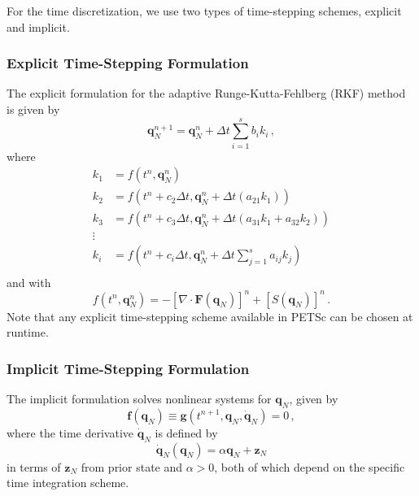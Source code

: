 For the time discretization, we use two types of time-stepping schemes, explicit and implicit.

\subsubsection{Explicit Time-Stepping Formulation}

The explicit formulation for the adaptive Runge-Kutta-Fehlberg (RKF) method is given by
\begin{equation}
       \mathbf{q}_N^{n+1} = \mathbf{q}_N^n + \Delta t \sum_{i=1}^{s} b_i k_i \, ,
\end{equation}
where
\begin{equation}
       \begin{aligned}
          k_1 &= f(t^n, \mathbf{q}_N^n)\\
          k_2 &= f(t^n + c_2 \Delta t, \mathbf{q}_N^n + \Delta t (a_{21} k_1))\\
          k_3 &= f(t^n + c_3 \Delta t, \mathbf{q}_N^n + \Delta t (a_{31} k_1 + a_{32} k_2))\\
          \vdots&\\
          k_i &= f\left(t^n + c_i \Delta t, \mathbf{q}_N^n + \Delta t \sum_{j=1}^s a_{ij} k_j \right)\\
       \end{aligned}
\end{equation}
and with
\begin{equation}
       f(t^n, \mathbf{q}_N^n) = - [\nabla \cdot \mathbf{F}(\mathbf{q}_N)]^n + [S(\mathbf{q}_N)]^n \, .
\end{equation}
Note that any explicit time-stepping scheme available in PETSc can be chosen at runtime.

\subsubsection{Implicit Time-Stepping Formulation}

The implicit formulation solves nonlinear systems for $\mathbf q_N$, given by
\begin{equation}
       \mathbf f(\mathbf q_N) \equiv \mathbf g(t^{n+1}, \mathbf{q}_N, \mathbf{\dot{q}}_N) = 0 \, ,
       \label{eq:ts-implicit-ns}
\end{equation}
where the time derivative $\mathbf{\dot q}_N$ is defined by
\begin{equation}
      \mathbf{\dot{q}}_N(\mathbf q_N) = \alpha \mathbf q_N + \mathbf z_N
\end{equation}
in terms of $\mathbf z_N$ from prior state and $\alpha > 0$, both of which depend on the specific time integration scheme.

